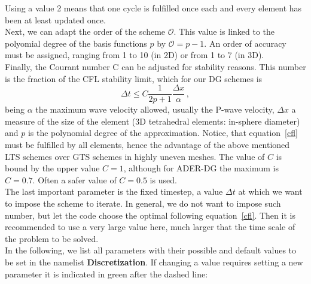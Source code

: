 \documentclass[12pt,twoside]{article}
\def\O{{\mathcal O}}
\begin{document}
Using a value 2 means that one cycle is fulfilled once each and every 
element has been at least updated once.\\
Next, we can adapt the order of the scheme $\O$.
This value is linked to the polyomial degree of the basis functions $p$ by $\O=p-1$.
An order of accuracy must be assigned, ranging from 1 to 10 (in 2D) or from 1 to 7 (in 3D).\\
Finally, the Courant number C can be adjusted for stability reasons.
This number is the fraction of the CFL stability limit, which for our DG schemes is
\begin{equation}
\label{cfl}
\Delta t\leq C \frac{1}{2p+1}\frac{\Delta x}{\alpha}\,,
\end{equation}
being $\alpha$ the maximum wave velocity allowed, usually the P-wave velocity, 
$\Delta x$ a measure of the size of the element (3D tetrahedral elements: in-sphere diameter)
and $p$ is the polynomial degree of the approximation. 
Notice, that equation~\eqref{cfl} must be fulfilled by all elements, 
hence the advantage of the above mentioned LTS schemes over GTS schemes in highly uneven meshes.
The value of $C$ is bound by the upper value $C=1$, although for ADER-DG the maximum is $C=0.7$. 
Often a safer value of $C=0.5$ is used.\\
The last important parameter is the fixed timestep, a value $\Delta t$ at which we want to impose the scheme to iterate.
In general, we do not want to impose such number, but let the code choose the optimal following equation~\eqref{cfl}.
Then it is recommended to use a very large value here, much larger that the time scale of the problem to be solved.\\

In the following, we list all parameters with their possible and default values to be set in the namelist \textbf{Discretization}.
If changing a value requires setting a new parameter it is indicated in green after the dashed line:\\
\end{document}

